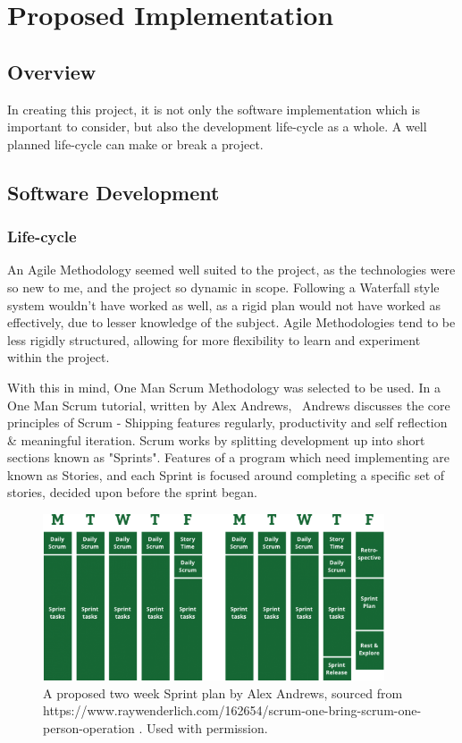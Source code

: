 \documentclass[a4paper,10pt]{report}
\begin{document}
\section{Proposed Implementation}
\subsection{Overview}

In creating this project, it is not only the software implementation which is important to consider, but also the development life-cycle as a whole. A well planned life-cycle can make or break a project. 

\subsection{Software Development}
\subsubsection{Life-cycle}

An Agile Methodology seemed well suited to the project, as the technologies were so new to me, and the project so dynamic in scope. Following a Waterfall style system wouldn't have worked as well, as a rigid plan would not have worked as effectively, due to lesser knowledge of the subject. Agile Methodologies tend to be less rigidly structured, allowing for more flexibility to learn and experiment within the project. \medskip

With this in mind, One Man Scrum Methodology was selected to be used. In a One Man Scrum tutorial, written by Alex Andrews,~\cite{andrews_2017} Andrews discusses the core principles of Scrum - Shipping features regularly, productivity and self reflection \& meaningful iteration. Scrum works by splitting development up into short sections known as "Sprints". Features of a program which need implementing are known as Stories, and each Sprint is focused around completing a specific set of stories, decided upon before the sprint began. \medskip

\begin{figure}[h!]
    \centering
  \includegraphics[width=0.9\textwidth]{Images/External/RayWenderlich.png}
 \caption [A proposed two week Sprint plan by Alex Andrews]{A proposed two week Sprint plan by Alex Andrews, sourced from https://www.raywenderlich.com/162654/scrum-one-bring-scrum-one-person-operation . Used with permission.}
 \label{fig:two_week_sprint_plan}
\end{figure}
\end{document}
